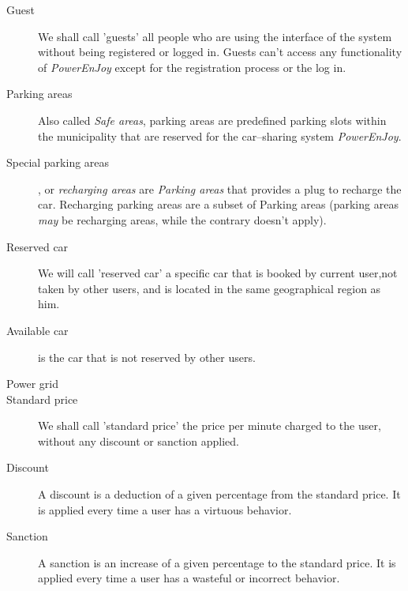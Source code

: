 \documentclass{article}
\begin{document}
\begin{description}
				\item[Guest] We shall call 'guests' all people who are using the interface of the system without being registered or logged in. Guests can't access any functionality of \textit{PowerEnJoy} except for the registration process or the log in. 
				
				
				\item[Parking areas] Also called \textit{Safe areas}, parking areas are predefined parking slots within the municipality that are reserved for the car–sharing system \textit{PowerEnJoy}.
				\item[Special parking areas], or \textit{recharging areas} are \textit{Parking areas} that provides a plug to recharge the car. Recharging parking areas are a subset of Parking areas (parking areas \textit{may} be recharging areas, while the contrary doesn't apply).
				
				\item [Reserved car] We will call 'reserved car' a specific car that is booked by current user,not taken by other users, and is located in the same geographical region as him.
				
				\item [Available car] is the car that is not reserved by other users.
				
				\item[Power grid] %
				
				\item[Standard price] We shall call 'standard price' the price per minute charged to the user, without any discount or sanction applied. 
				
				\item[Discount] A discount is a deduction of a given percentage from the standard price. It is applied every time a user has a virtuous behavior. %
				\item[Sanction] A sanction is an increase of a given percentage to the standard price. It is applied every time a user has a wasteful or incorrect behavior. %
				

\end{description}
\end{document}
